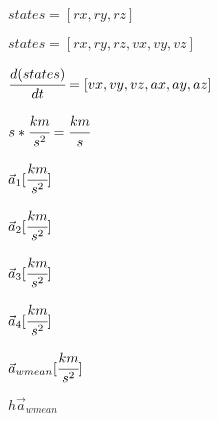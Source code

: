 \documentclass{article}
\begin{document}
\color{magenta}
\begin{center}\huge{
$states=[rx,ry,rz]$
}
\end{center}

\begin{center}\huge{
$states=[rx,ry,rz,vx,vy,vz]$
}
\end{center}

\begin{center}\huge{
$\cfrac{d(states)}{dt}=[vx,vy,vz,ax,ay,az]$
}
\end{center}

\begin{center}\huge{
$s * \cfrac{km}{s^2}=\cfrac{km}{s}$
}
\end{center}

\begin{center}\huge{
\color{red}
$\vec{a}_1 [\cfrac{km}{s^2}]$

\color{green}
$\vec{a}_2 [\cfrac{km}{s^2}]$

\color{blue}
$\vec{a}_3 [\cfrac{km}{s^2}]$

\color{white}
$\vec{a}_4 [\cfrac{km}{s^2}]$

\color{magenta}
$\vec{a}_{wmean} [\cfrac{km}{s^2}]$

$h\vec{a}_{wmean}$
}
\end{center}
\end{document}
